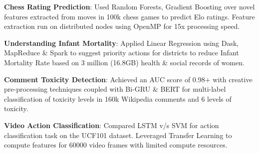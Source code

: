 \documentclass[letterpaper,10pt]{article}
\newcommand{\resumeItem}[2]{
	\item\normalsize{
		\textbf{#1}{: #2}
	}\vspace{-2pt}
}
\newcommand{\resumeItemText}[1]{
	\item\normalsize{
		{#1}
	}\vspace{-2pt}
}
\newcommand{\resumeSubItem}[2]{\resumeItem{#1}{#2}\vspace{0pt}}
\newcommand{\resumeSubItemText}[1]{\resumeItemText{#1}\vspace{0pt}}
\begin{document}
	\resumeSubItem{Chess Rating Prediction}{Used Random Forests, Gradient Boosting over novel features extracted from moves in 100k chess games to predict Elo ratings. Feature extraction run on distributed nodes using OpenMP for 15x processing speed.}
	\resumeSubItem{Understanding Infant Mortality}{Applied Linear Regression using Dask, MapReduce \& Spark to suggest priority actions for districts to reduce Infant Mortality Rate based on 3 million (16.8GB) health \& social records of women.}
	\resumeSubItem{Comment Toxicity Detection}{Achieved an AUC score of 0.98+ with creative pre-processing techniques coupled with Bi-GRU \& BERT for multi-label classification of toxicity levels in 160k Wikipedia comments and 6 levels of toxicity. }
	\resumeSubItem{Video Action Classification}{Compared LSTM v/s SVM for action classification task on the UCF101 dataset. Leveraged Transfer Learning to compute features for 60000 video frames with limited compute resources.}
\end{document}
